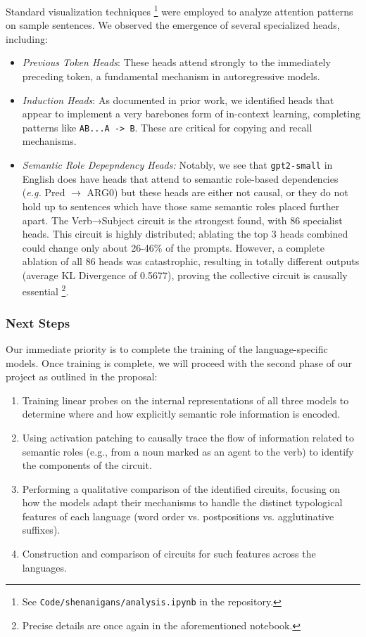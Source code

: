 \documentclass[11pt]{article}
\begin{document}
Standard visualization techniques \footnote{See \texttt{Code/shenanigans/analysis.ipynb} in the repository.} were employed to analyze attention patterns on sample sentences. We observed the emergence of several specialized heads, including:

\begin{itemize}
\item \emph{Previous Token Heads}: These heads attend strongly to the immediately preceding token, a fundamental mechanism in autoregressive models.
\item \emph{Induction Heads}: As documented in prior work, we identified heads that appear to implement a very barebones form of in-context learning, completing patterns like \texttt{AB...A -> B}. These are critical for copying and recall mechanisms.
\item \emph{Semantic Role Depepndency Heads:} Notably, we see that \texttt{gpt2-small} in English does have heads that attend to semantic role-based dependencies (\emph{e.g.} Pred \(\rightarrow\) ARG0) but these heads are either not causal, or they do not hold up to sentences which have those same semantic roles placed further apart. The Verb→Subject circuit is the strongest found, with 86 specialist heads. This circuit is highly distributed; ablating the top 3 heads combined could change only about 26-46\% of the prompts. However, a complete ablation of all 86 heads was catastrophic, resulting in totally different outputs (average KL Divergence of 0.5677), proving the collective circuit is causally essential \footnote{Precise details are once again in the aforementioned notebook.}.
\end{itemize}
\subsubsection*{Next Steps}
\label{sec:org18f6e72}

Our immediate priority is to complete the training of the language-specific models. Once training is complete, we will proceed with the second phase of our project as outlined in the proposal:

\begin{enumerate}
\item Training linear probes on the internal representations of all three models to determine where and how explicitly semantic role information is encoded.
\item Using activation patching to causally trace the flow of information related to semantic roles (e.g., from a noun marked as an agent to the verb) to identify the components of the circuit.
\item Performing a qualitative comparison of the identified circuits, focusing on how the models adapt their mechanisms to handle the distinct typological features of each language (word order vs. postpositions vs. agglutinative suffixes).
\item Construction and comparison of circuits for such features across the languages.
\end{enumerate}
\end{document}
